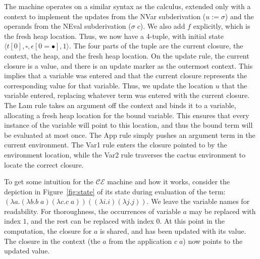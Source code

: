 The machine operates on a similar syntax as the calculus, extended only with a
context to implement the updates from the NVar subderivation ($u:=\sigma$) and
the operands from the NEval subderivation ($\sigma \; c$). We also add $f$
explicitly, which is the fresh heap location. Thus, we now have a 4-tuple, with
initial state $\langle t[0], \square, \epsilon[0=\bullet], 1\rangle$. The four
parts of the tuple are the current closure, the context, the heap, and the fresh
heap location. On the update rule, the current closure is a value, and there is
an update marker as the outermost context. This implies that a variable was
entered and that the current closure represents the corresponding value for that
variable. Thus, we update the location $u$ that the variable entered, replacing
whatever term was entered with the current closure. The Lam rule takes an
argument off the context and binds it to a variable, allocating a fresh heap
location for the bound variable. This ensures that every instance of the
variable will point to this location, and thus the bound term will be
evaluated at most once. The App rule simply pushes an argument term in the
current environment. The Var1 rule enters the closure pointed to by the
environment location, while the Var2 rule traverses the cactus environment to
locate the correct closure.  

To get some intuition for the $\mathcal{CE}$ machine and how it works, consider
the depiction in Figure~\ref{fig:state} of its state during evaluation of the
term: $(\lambda a.(\lambda b.b \; a) (\lambda c.c \; a)) ((\lambda i.i) (\lambda
j.j))$. We leave the variable names for readability. For thoroughness, the
occurrences of variable $a$ may be replaced with index $1$, and the rest can be
replaced with index $0$. At this point in the computation, the closure for $a$
is shared, and has been updated with its value. The closure in the context (the
$a$ from the application $c \; a$) now points to the updated value.

